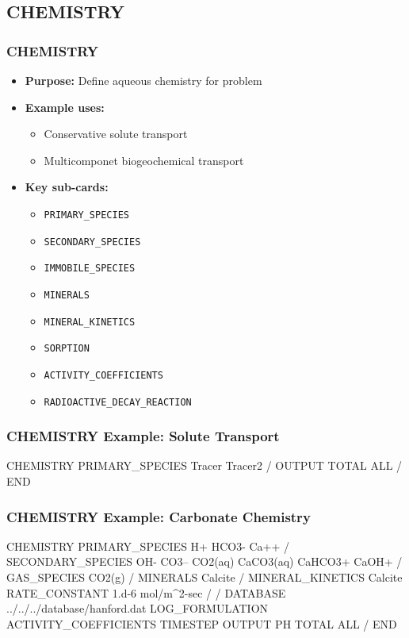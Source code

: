 \subsection{CHEMISTRY}

\begin{frame}\frametitle{CHEMISTRY}

\begin{itemize}
\item[] \textbf{Purpose:} Define aqueous chemistry for problem
\item[] \textbf{Example uses:}
\begin{itemize}
  \item Conservative solute transport
  \item Multicomponet biogeochemical transport
\end{itemize}
\item[] \textbf{Key sub-cards:}
\begin{itemize}
  \item[] \verb|PRIMARY_SPECIES|
  \item[] \verb|SECONDARY_SPECIES|
  \item[] \verb|IMMOBILE_SPECIES|
  \item[] \verb|MINERALS|
  \item[] \verb|MINERAL_KINETICS|
  \item[] \verb|SORPTION|
  \item[] \verb|ACTIVITY_COEFFICIENTS|
  \item[] \verb|RADIOACTIVE_DECAY_REACTION|
  
\end{itemize}
\end{itemize}

\end{frame}

\begin{frame}[fragile]\frametitle{CHEMISTRY Example: Solute Transport}

\begin{semiverbatim}
CHEMISTRY
  PRIMARY_SPECIES
    Tracer
    Tracer2
  /
  OUTPUT
    TOTAL
    ALL
  /
END
\end{semiverbatim}

\end{frame}

\begin{frame}[fragile]\frametitle{CHEMISTRY Example: Carbonate Chemistry}

\tiny
\begin{semiverbatim}
CHEMISTRY
  PRIMARY_SPECIES
    H+
    HCO3-
    Ca++
  /
  SECONDARY_SPECIES
    OH-
    CO3--
    CO2(aq)
    CaCO3(aq)
    CaHCO3+
    CaOH+
  /
  GAS_SPECIES
    CO2(g)
  /
  MINERALS
    Calcite
  /
  MINERAL_KINETICS
    Calcite
      RATE_CONSTANT 1.d-6 mol/m^2-sec
    /
  /
  DATABASE ../../../database/hanford.dat
  LOG_FORMULATION
  ACTIVITY_COEFFICIENTS TIMESTEP
  OUTPUT
    PH
    TOTAL
    ALL
  /
END
\end{semiverbatim}

\end{frame}
